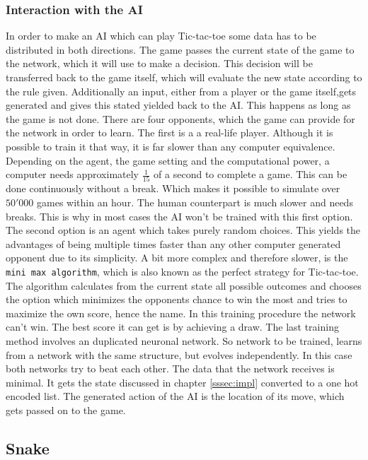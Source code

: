 \documentclass[12pt]{article}
\begin{document}
\subsubsection{Interaction with the AI}
In order to make an \gls{AI} which can play Tic-tac-toe some data has to be distributed in both directions. The game passes the current \gls{state} of the game to the network, which it will use to make a decision. This decision will be transferred back to the game itself, which will evaluate the new \gls{state} according to the rule given. Additionally an  \gls{input}, either from a player or the game itself,gets generated and gives this stated yielded back to the \gls{AI}. This happens as long as the game is not done. There are four opponents, which the game can provide for the network in order to learn. The first is a a real-life player. Although it is possible to train it that way, it is far slower than any computer equivalence. Depending on the agent, the game setting and the computational power,  a computer needs approximately $\frac{1}{15}$ of a second to complete a game. This can be done continuously without a break. Which makes it possible to simulate over $50'000$ games within an hour. The human counterpart is much slower and needs breaks. This is why in most cases the \gls{AI} won't be trained with this first option. The second option is an agent which takes purely random choices. This yields the advantages of being multiple times faster than any other computer generated opponent due to its simplicity. A bit more complex and therefore slower, is the \lstinline{mini max algorithm}, which is also known as the perfect strategy for Tic-tac-toe. The algorithm calculates from the current \gls{state} all possible outcomes and chooses the option which minimizes the opponents chance to win the most and  tries to maximize the own score, hence the name. In this training procedure the network can't win. The best score it can get is by achieving a draw. The last training method involves an duplicated \gls{neuronal network}. So network to be trained, learns from a network with the same structure, but evolves independently. In this case both networks try to beat each other. The data that the network receives is minimal. It gets the \gls{state} discussed in chapter \ref{sssec:impl} converted to a one hot encoded list. The generated action of the \gls{AI} is the location of its move, which gets passed on to the game.
\subsection{Snake}
\end{document}

